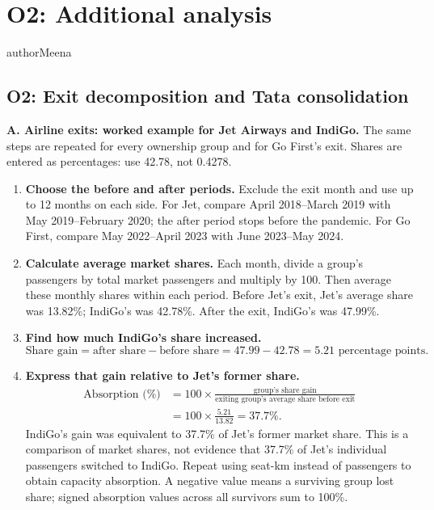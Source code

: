 \clearpage
\section{O2: Additional analysis}
\label{app:workings}
\begin{authorcontribution}{authorMeena}
\renewcommand{\arraystretch}{1.2}
\subsection*{O2: Exit decomposition and Tata consolidation}
\textbf{A. Airline exits: worked example for Jet Airways and IndiGo.}
The same steps are repeated for every ownership group and for Go First's exit. Shares are entered as percentages: use 42.78, not 0.4278.
\begin{enumerate}[leftmargin=2em]
	\item \textbf{Choose the before and after periods.} Exclude the exit month and use up to 12 months on each side. For Jet, compare April 2018--March 2019 with May 2019--February 2020; the after period stops before the pandemic. For Go First, compare May 2022--April 2023 with June 2023--May 2024.

	\item \textbf{Calculate average market shares.} Each month, divide a group's passengers by total market passengers and multiply by 100. Then average these monthly shares within each period. Before Jet's exit, Jet's average share was 13.82\%; IndiGo's was 42.78\%. After the exit, IndiGo's was 47.99\%.

	\item \textbf{Find how much IndiGo's share increased.}
	\[
	\text{Share gain} = \text{after share} - \text{before share}
	= 47.99 - 42.78 = 5.21\text{ percentage points}.
	\]

	\item \textbf{Express that gain relative to Jet's former share.}
	\[
	\begin{aligned}
	\text{Absorption (\%)} &= 100\times\frac{\text{group's share gain}}{\text{exiting group's average share before exit}}\\
	&= 100\times\frac{5.21}{13.82} = 37.7\%.
	\end{aligned}
	\]
	IndiGo's gain was equivalent to 37.7\% of Jet's former market share. This is a comparison of market shares, not evidence that 37.7\% of Jet's individual passengers switched to IndiGo. Repeat using seat-km instead of passengers to obtain capacity absorption. A negative value means a surviving group lost share; signed absorption values across all survivors sum to 100\%.


\end{enumerate}
\end{authorcontribution}
